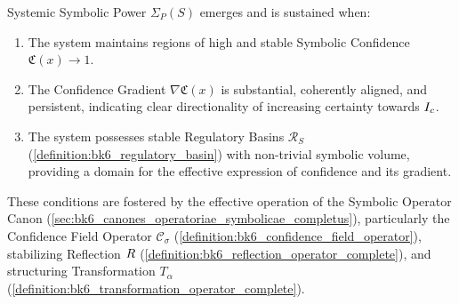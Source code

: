 \begin{proposition}
\label{proposition:bk7_power_from_coherent_confidence_regulation}
Systemic Symbolic Power \(\Sigma_P(S)\) emerges and is sustained when:
\begin{enumerate}
    \item The system maintains regions of high and stable Symbolic Confidence \(\mathfrak{C}(x) \to 1\).
    \item The Confidence Gradient \(\nabla \mathfrak{C}(x)\) is substantial, coherently aligned, and persistent, indicating clear directionality of increasing certainty towards \(I_c\).
    \item The system possesses stable Regulatory Basins \(\mathcal{R}_S\) (\ref{definition:bk6_regulatory_basin}) with non-trivial symbolic volume, providing a domain for the effective expression of confidence and its gradient.
\end{enumerate}
These conditions are fostered by the effective operation of the Symbolic Operator Canon (\ref{sec:bk6_canones_operatoriae_symbolicae_completus}), particularly the Confidence Field Operator \(\mathcal{C}_\sigma\) (\ref{definition:bk6_confidence_field_operator}), stabilizing Reflection \(R\) (\ref{definition:bk6_reflection_operator_complete}), and structuring Transformation \(T_\alpha\) (\ref{definition:bk6_transformation_operator_complete}).
\end{proposition}
